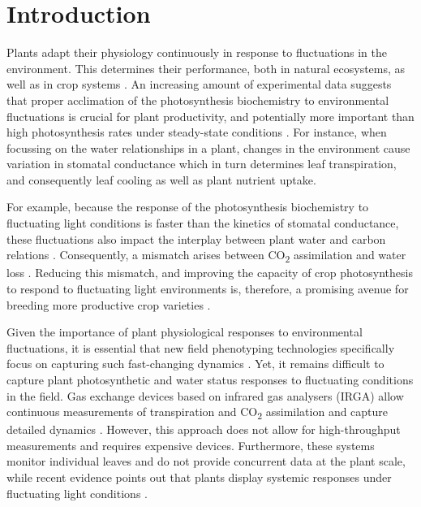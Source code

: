 \documentclass[10pt,authoryear,a4paper,review]{elsarticle}
\begin{document}

\section{Introduction}
 
    Plants adapt their physiology continuously in response to fluctuations in the environment. This determines their performance, both in natural ecosystems, as well as in crop systems \citep{schurrFunctional2006,arsovaDynamics2020}. An increasing amount of experimental data suggests that proper acclimation of the photosynthesis biochemistry to environmental fluctuations is crucial for plant productivity, and potentially more important than high photosynthesis rates under steady-state conditions \citep{kaiserFluctuating2018,kromdijkImproving2016,vialet-chabrandImportance2017,matthewsAcclimation2018,townsendSuboptimal2018}.
    For instance, when focussing on the water relationships in a plant, changes in the environment cause variation in stomatal conductance which in turn determines leaf transpiration, and consequently leaf cooling as well as plant nutrient uptake.
 
    For example, because the response of the photosynthesis biochemistry to fluctuating light conditions is faster than the kinetics of stomatal conductance, these fluctuations also impact the interplay between plant water and carbon relations \citep{lawsonImproving2012,lawsonStomatal2014}. Consequently, a mismatch arises between CO\textsubscript{2} assimilation and water loss \citep{mcauslandEffects2016}. Reducing this mismatch, and improving the capacity of crop photosynthesis to respond to fluctuating light environments is, therefore, a promising avenue for breeding more productive crop varieties \citep{salterRate2019,murchieDynamic2020}. 
 
    Given the importance of plant physiological responses to environmental fluctuations,  it is essential that new field phenotyping technologies specifically focus on capturing such fast-changing dynamics \citep{murchieMeasuring2018}. Yet, it remains difficult to capture plant photosynthetic and water status responses to fluctuating conditions in the field. Gas exchange devices based on infrared gas analysers (IRGA) allow continuous measurements of transpiration and CO\textsubscript{2} assimilation and capture detailed dynamics \citep{kromdijkImproving2016}. However, this approach does not allow for high-throughput measurements and requires expensive devices. Furthermore, these systems monitor individual leaves and do not provide concurrent data at the plant scale, while recent evidence points out that plants display systemic responses under fluctuating light conditions \citep{shimadzuWhole2019}. 
 
\end{document}
